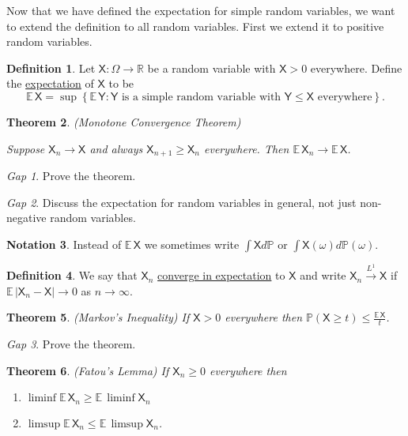 \documentclass[11pt]{article}
\newcommand{\rv}[1]{\mathsf{#1}}
\newcommand{\p}{\mathbb{P}}
\newcommand{\ex}{\mathbb{E}\,}
\newcommand{\defname}[1]{\underline{#1}}
\newcommand{\exto}{\xrightarrow{L^1}}
\newcommand{\RR}{\mathbb{R}}
\theoremstyle{theorem}
\newtheorem{theorem}{Theorem}[section]
\theoremstyle{definition}
\newtheorem{definition}[theorem]{Definition}
\newtheorem{notation}[theorem]{Notation}
\theoremstyle{remark}
\theoremstyle{step}
\theoremstyle{gap}
\newtheorem*{gap}{Gap}
\begin{document}
Now that we have defined the expectation for simple random variables, we want to extend the definition to all random variables. First we extend it to positive random variables.

\begin{definition}
Let \(\rv{X}: \Omega \to \RR\) be a random variable with \(\rv{X} > 0\) everywhere. Define the \defname{expectation} of \(\rv{X}\) to be
\[\ex \rv{X} = \sup \left\{\ex \rv{Y} : \rv{Y} \text{ is a simple random variable with } \rv{Y} \leq \rv{X} \text{ everywhere} \right\}.\]
\end{definition}

\begin{theorem}{(Monotone Convergence Theorem)}\ 

Suppose \(\rv{X}_n \to \rv{X}\) and always \(\rv{X}_{n+1} \geq \rv{X}_{n}\) everywhere. Then \(\ex \rv{X}_n \to \ex \rv{X}\).
\end{theorem}

\begin{gap}
Prove the theorem.
\end{gap}

\begin{gap}
Discuss the expectation for random variables in general, not just non-negative random variables.
\end{gap}

\begin{notation}
Instead of \(\ex \rv{X}\) we sometimes write \(\int \rv{X} d\p\) or \(\int \rv{X}(\omega) d\p(\omega)\).
\end{notation}

\begin{definition}
We say that \(\rv{X}_n\) \defname{converge in expectation} to \(\rv{X}\) and write \(\rv{X}_n \exto \rv{X}\) if \(\ex |\rv{X}_n - \rv{X}| \to 0\) as \(n \to \infty\).
\end{definition}

\begin{theorem}{(Markov's Inequality)}
If \(\rv{X} > 0\) everywhere then \(\p(\rv{X} \geq t) \leq \frac{\ex \rv{X}}{t}\).
\end{theorem}

\begin{gap}
Prove the theorem.
\end{gap}

\begin{theorem}{(Fatou's Lemma)}
If \(\rv{X}_n \geq 0\) everywhere then
\begin{enumerate}
\item
\(\liminf \ex \rv{X}_n \geq \ex \liminf \rv{X}_n\)
\item
\(\limsup \ex \rv{X}_n \leq \ex \limsup \rv{X}_n\).
\end{enumerate}
\end{theorem}
\end{document}
